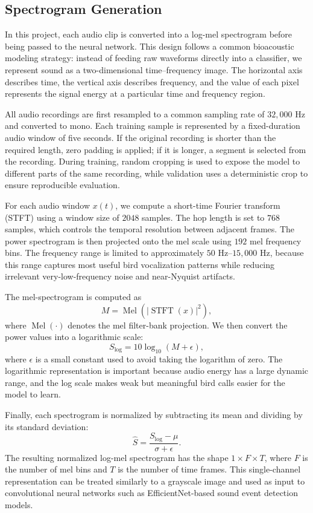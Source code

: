 \documentclass[a4paper,12pt]{article}
\begin{document}
\subsection{Spectrogram Generation}

In this project, each audio clip is converted into a log-mel spectrogram before being passed to the neural network. This design follows a common bioacoustic modeling strategy: instead of feeding raw waveforms directly into a classifier, we represent sound as a two-dimensional time--frequency image. The horizontal axis describes time, the vertical axis describes frequency, and the value of each pixel represents the signal energy at a particular time and frequency region.

All audio recordings are first resampled to a common sampling rate of $32{,}000$ Hz and converted to mono. Each training sample is represented by a fixed-duration audio window of five seconds. If the original recording is shorter than the required length, zero padding is applied; if it is longer, a segment is selected from the recording. During training, random cropping is used to expose the model to different parts of the same recording, while validation uses a deterministic crop to ensure reproducible evaluation.

For each audio window $x(t)$, we compute a short-time Fourier transform (STFT) using a window size of $2048$ samples. The hop length is set to $768$ samples, which controls the temporal resolution between adjacent frames. The power spectrogram is then projected onto the mel scale using $192$ mel frequency bins. The frequency range is limited to approximately $50$ Hz--$15{,}000$ Hz, because this range captures most useful bird vocalization patterns while reducing irrelevant very-low-frequency noise and near-Nyquist artifacts.

The mel-spectrogram is computed as
\[
M = \operatorname{Mel}\left(|\operatorname{STFT}(x)|^2\right),
\]
where $\operatorname{Mel}(\cdot)$ denotes the mel filter-bank projection. We then convert the power values into a logarithmic scale:
\[
S_{\log} = 10 \log_{10}(M + \epsilon),
\]
where $\epsilon$ is a small constant used to avoid taking the logarithm of zero. The logarithmic representation is important because audio energy has a large dynamic range, and the log scale makes weak but meaningful bird calls easier for the model to learn.

Finally, each spectrogram is normalized by subtracting its mean and dividing by its standard deviation:
\[
\hat{S} = \frac{S_{\log} - \mu}{\sigma + \epsilon}.
\]
The resulting normalized log-mel spectrogram has the shape $1 \times F \times T$, where $F$ is the number of mel bins and $T$ is the number of time frames. This single-channel representation can be treated similarly to a grayscale image and used as input to convolutional neural networks such as EfficientNet-based sound event detection models.
\end{document}
